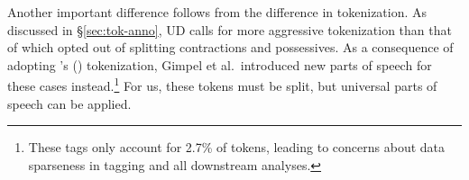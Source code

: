 \documentclass[11pt,a4paper]{article}
\newcommand{\citeposs}[2][]{\citeauthor{#2}'s (\citeyear[#1]{#2})}
\begin{document}
Another important difference follows from the difference in
tokenization.  As discussed in \S\ref{sec:tok-anno}, UD calls for more
aggressive tokenization than that of \citet{ICWSM101540} which opted
out of splitting contractions and possessives. As a consequence of adopting \citeposs{ICWSM101540} tokenization, 
Gimpel et al.~introduced new parts of speech for these cases
instead.\footnote{These tags only account for 2.7\% of tokens,
  leading to concerns about data sparseness in tagging and all
  downstream analyses.}  For us, these tokens must be split, but
universal parts of speech can be applied.

\end{document}
